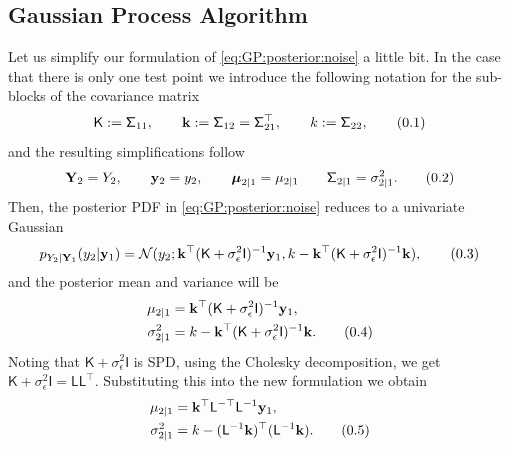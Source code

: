 \documentclass[10pt]{article}
\theoremstyle{definition}
\newcommand\eqnum{\addtocounter{equation}{1}\tag{\arabic{section}.\arabic{equation}}}
\begin{document}
\subsection{Gaussian Process Algorithm}
Let us simplify our formulation of \cref{eq:GP:posterior:noise} a little bit. In the case that there is only one test point we introduce the following notation for the sub-blocks of the covariance matrix
\begin{equation*}
\mathsf{K}:=\mathsf{\Sigma}_{11} ,  \qquad
\mathbf{k}:=\mathsf{\Sigma}_{12}  =\mathsf{\Sigma}_{21}^{\top}, \qquad
k := \mathsf{\Sigma}_{22},
\eqnum
\end{equation*}
and the resulting simplifications follow
\begin{equation*}
\mathbf{Y}_2 = Y_2, \qquad
\mathbf{y}_2 = y_2, \qquad
\boldsymbol{\mu}_{2|1} = \mu_{2|1} \qquad
\mathsf{\Sigma}_{2|1} = \sigma_{2|1}^2.
\eqnum
\end{equation*}
Then, the posterior PDF in \cref{eq:GP:posterior:noise} reduces to a univariate Gaussian
\begin{equation*}
p_{Y_2|\mathbf{Y}_1}(y_2|\mathbf{y}_1) = 
\mathcal{N}(y_2; \mathbf{k}^{\top}(\mathsf{K} + \sigma_{\epsilon}^2\mathsf{I})^{-1}\mathbf{y}_1, k - 
\mathbf{k}^{\top} (\mathsf{K}+\sigma_{\epsilon}^2\mathsf{I})^{-1} \mathbf{k}),
\eqnum
\label{eq:GP:posterior:single}
\end{equation*}
and the posterior mean and variance will be
\begin{align*}
\mu_{2|1}  &= \mathbf{k}^{\top}(\mathsf{K}+\sigma_{\epsilon}^2\mathsf{I})^{-1}\mathbf{y}_1, \\
\sigma_{2|1}^2 &= k - \mathbf{k}^{\top} (\mathsf{K}+\sigma_{\epsilon}^2\mathsf{I})^{-1} \mathbf{k}.
\eqnum
\end{align*}
Noting that $\mathsf{K}+\sigma_{\epsilon}^2\mathsf{I}$ is SPD, using the Cholesky decomposition, we get $\mathsf{K}+\sigma_{\epsilon}^2\mathsf{I}=\mathsf{L}\mathsf{L}^{\top}$. Substituting this into the new formulation we obtain
\begin{align*}
\mu_{2|1}  &= \mathbf{k}^{\top}\mathsf{L}^{-\top}\mathsf{L}^{-1}\mathbf{y}_1, \\
\sigma_{2|1}^2 &= k - (\mathsf{L}^{-1}\mathbf{k})^{\top}(\mathsf{L}^{-1}\mathbf{k}).
\eqnum
\label{eq:GP:posterior:alg}
\end{align*}
\end{document}
